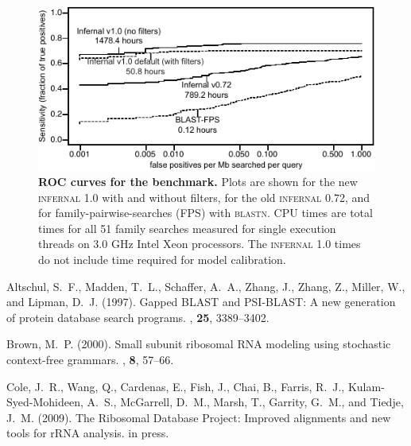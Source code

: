 \documentclass{bioinfo}
\begin{document}
\begin{application}
\begin{figure}[h]
\centerline{\includegraphics{roc-short}}
\caption{\textbf{ROC curves for the benchmark.}  Plots are shown for
the new \textsc{infernal} 1.0 with and without filters, for the old
\textsc{infernal} 0.72, and for family-pairwise-searches (FPS) with
\textsc{blastn}. CPU times are total times for all 51 family
searches measured for single execution threads on 3.0 GHz Intel Xeon
 processors. The \textsc{infernal} 1.0 times do not include time
 required for model calibration.}
\end{figure}


%
%

%
%

\begin{thebibliography}{}

Altschul, S.~F., Madden, T.~L., Schaffer, A.~A., Zhang, J., Zhang, Z., Miller,
  W., and Lipman, D.~J. (1997).
\newblock Gapped {BLAST} and {PSI-BLAST}: A new generation of protein database
  search programs.
, {\bf 25}, 3389--3402.

Brown, M.~P. (2000).
\newblock Small subunit ribosomal {RNA} modeling using stochastic context-free
  grammars.
, {\bf 8}, 57--66.

Cole, J.~R., Wang, Q., Cardenas, E., Fish, J., Chai, B., Farris, R.~J.,
  Kulam-Syed-Mohideen, A.~S., McGarrell, D.~M., Marsh, T., Garrity, G.~M., and
  Tiedje, J.~M. (2009).
\newblock The {R}ibosomal {D}atabase {P}roject: Improved alignments and new
  tools for {rRNA} analysis.
\newblock in press.


\end{thebibliography}
\end{application}
\end{document}
